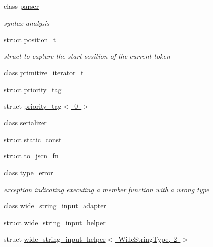 \begin{DoxyCompactItemize}
class \mbox{\hyperlink{classnlohmann_1_1detail_1_1parser}{parser}}
\begin{DoxyCompactList}\small\item\em syntax analysis \end{DoxyCompactList}\item 
struct \mbox{\hyperlink{structnlohmann_1_1detail_1_1position__t}{position\+\_\+t}}
\begin{DoxyCompactList}\small\item\em struct to capture the start position of the current token \end{DoxyCompactList}\item 
class \mbox{\hyperlink{classnlohmann_1_1detail_1_1primitive__iterator__t}{primitive\+\_\+iterator\+\_\+t}}
\item 
struct \mbox{\hyperlink{structnlohmann_1_1detail_1_1priority__tag}{priority\+\_\+tag}}
\item 
struct \mbox{\hyperlink{structnlohmann_1_1detail_1_1priority__tag_3_010_01_4}{priority\+\_\+tag$<$ 0 $>$}}
\item 
class \mbox{\hyperlink{classnlohmann_1_1detail_1_1serializer}{serializer}}
\item 
struct \mbox{\hyperlink{structnlohmann_1_1detail_1_1static__const}{static\+\_\+const}}
\item 
struct \mbox{\hyperlink{structnlohmann_1_1detail_1_1to__json__fn}{to\+\_\+json\+\_\+fn}}
\item 
class \mbox{\hyperlink{classnlohmann_1_1detail_1_1type__error}{type\+\_\+error}}
\begin{DoxyCompactList}\small\item\em exception indicating executing a member function with a wrong type \end{DoxyCompactList}\item 
class \mbox{\hyperlink{classnlohmann_1_1detail_1_1wide__string__input__adapter}{wide\+\_\+string\+\_\+input\+\_\+adapter}}
\item 
struct \mbox{\hyperlink{structnlohmann_1_1detail_1_1wide__string__input__helper}{wide\+\_\+string\+\_\+input\+\_\+helper}}
\item 
struct \mbox{\hyperlink{structnlohmann_1_1detail_1_1wide__string__input__helper_3_01_wide_string_type_00_012_01_4}{wide\+\_\+string\+\_\+input\+\_\+helper$<$ Wide\+String\+Type, 2 $>$}}
\end{DoxyCompactItemize}
